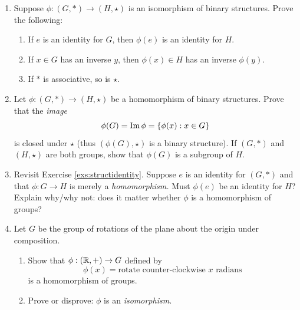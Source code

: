 \begin{exercises}{}
\begin{enumerate}

  
  \item\label{exs:structural1} Suppose $\phi:(G,*)\to (H,\star)$ is an isomorphism of binary structures. Prove the following:
  \begin{enumerate}
    \item\label{exs:structidentity} If $e$ is an identity for $G$, then $\phi(e)$ is an identity for $H$.
    \item If $x\in G$ has an inverse $y$, then $\phi(x)\in H$ has an inverse $\phi(y)$.
    \item If $*$ is associative, so is $\star$.
  \end{enumerate}
  
  \item Let $\phi:(G,*)\to (H,\star)$ be a homomorphism of binary structures. Prove that the \emph{image}
  \[\phi(G)=\operatorname{Im} \phi=\{\phi(x):x\in G\}\]
  is closed under $\star$ (thus $(\phi(G),\star)$ is a binary structure). If $(G,*)$ and $(H,\star)$ are both groups, show that $\phi(G)$ is a subgroup of $H$.
  
  \item Revisit Exercise \ref{exs:structidentity}. Suppose $e$ is an identity for $(G,*)$ and that $\phi:G\to H$ is merely a \emph{homomorphism.} Must $\phi(e)$ be an identity for $H$? Explain why/why not: does it matter whether $\phi$ is a homomorphism of groups?
  
  \item Let $G$ be the group of rotations of the plane about the origin under composition.
  \begin{enumerate}
		\item Show that $\phi:(\mathbb{R},+)\to G$ defined by
		\[\phi(x)=\text{rotate counter-clockwise $x$ radians}\]
  	is a homomorphism of groups.
		\item Prove or disprove: $\phi$ is an \emph{isomorphism.}
	\end{enumerate}
	


\end{enumerate}
\end{exercises}
